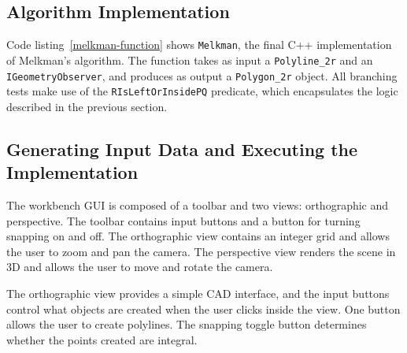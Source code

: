 




% 
  

\FloatBarrier
\subsection{Algorithm Implementation}

Code listing~\ref{melkman-function} shows \texttt{Melkman}, the final C++
implementation of Melkman's algorithm. The function takes as input a
\texttt{Polyline\_2r} and an \texttt{IGeometryObserver}, and produces as output
a \texttt{Polygon\_2r} object. All branching tests make use of the
\texttt{RIsLeftOrInsidePQ} predicate, which encapsulates the logic described in
the previous section.
 


 
\FloatBarrier
\subsection{Generating Input Data and Executing the Implementation} 

The workbench GUI is composed of a toolbar and two views: orthographic and
perspective. The toolbar contains input buttons and a button for turning
snapping on and off. The orthographic view contains an integer grid and allows
the user to zoom and pan the camera. The perspective view renders the scene in
3D and allows the user to move and rotate the camera.

The orthographic view provides a simple CAD interface, and the input buttons
control what objects are created when the user clicks inside the view. One
button allows the user to create polylines. The snapping toggle button
determines whether the points created are integral. 

